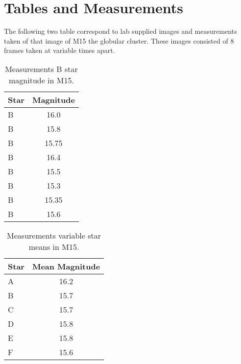 \documentclass{article}
\begin{document}

\section{Tables and Measurements}

The following two table correspond to lab supplied images and measurements taken
of that image of M15 the globular cluster. These images consisted of 8 frames taken
at variable times apart.

\begin{table}[h!]
\begin{center}
\begin{tabular}{l c}
\hline
Star & Magnitude\\
\hline
\hline
B & 16.0\\
B & 15.8\\
B & 15.75\\
B & 16.4\\
B & 15.5\\
B & 15.3\\
B & 15.35\\
B & 15.6\\
\hline
\end{tabular}
\end{center}
\caption{Measurements B star magnitude in M15.\label{tab:m15}}
\end{table}

\begin{table}[h!]
\begin{center}
\begin{tabular}{l c}
\hline
Star & Mean Magnitude\\
\hline
\hline
A & 16.2\\
B & 15.7\\
C & 15.7\\
D & 15.8\\
E & 15.8\\
F & 15.6\\
\hline
\end{tabular}
\end{center}
\caption{Measurements variable star means in M15.\label{tab:mean}}
\end{table}
\end{document}
